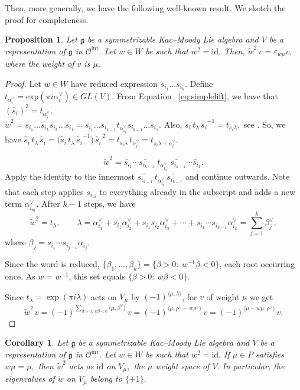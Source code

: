\documentclass[12pt,reqno]{amsart}
\theoremstyle{plain}
\newtheorem{corollary}[theorem]{Corollary}
\newtheorem{proposition}[theorem]{Proposition}
\theoremstyle{definition}
\theoremstyle{plain}
\newcommand{\catoint}{\mathcal{O}^{\mathrm{int}}}
\newcommand{\lie}{\mathfrak}
\begin{document}
Then, more generally, we have the following well-known result. We sketch the proof for completeness. 
\begin{proposition}\label{proptitslift}
    Let $\lie g$ be a symmetrizable Kac--Moody Lie algebra and $V$ be a representation of $\lie g$ in $\catoint$. Let $w\in W$ be such that $w^2=\text{id}.$ Then, $
\widetilde w^2\,v=\varepsilon_{w\mu}v,$ where the weight of $v$ is $\mu$.
\end{proposition}
\begin{proof}
    Let $w\in W$ have reduced expression $s_{i_1}\ldots s_{i_k}$. Define $t_{\alpha_i^\vee}=\text{exp}(\pi i \alpha_i^\vee) \in GL(V).$ From Equation ~\eqref{eq:simplelift}, we have that  $(\widetilde{s_i})^2=t_{\alpha_i^\vee}.$ \\
    $\widetilde{w}^2=\widetilde{s_{i_1}}\ldots\widetilde{s_{i_k}}\widetilde{s_{i_k}}\ldots\widetilde{s_{i_1}}= \widetilde{s_{i_1}}\ldots\widetilde{s_{i_{k-1}}}t_{\alpha_{i_k}^\vee}\widetilde{s_{i_{k-1}}}\ldots\widetilde{s_{i_1}}.$ Also, $\widetilde{s_i}\,t_\lambda\,\widetilde{s_i}^{-1} =t_{s_i\lambda}, $ see \cite{S1}. So, we have
$\widetilde{s_i}\,t_{\lambda}\,\widetilde{s_i}
=\bigl(\widetilde{s_i}\,t_\lambda\,\widetilde{s_i}^{-1}\bigr)\,\widetilde{s_i}^{\,2}
=t_{s_i\lambda}\,t_{\alpha_i^\vee}
=t_{s_i\lambda+\alpha_i^\vee}.$ 

\[
\widetilde w^2=\widetilde{s_{i_1}}\cdots\widetilde{s_{i_{k-1}}}\;t_{\alpha_{i_k}^\vee}\;\widetilde{s_{i_{k-1}}}\cdots\widetilde{s_{i_1}}.
\]
Apply the identity to the innermost $\widetilde{s_{i_{k-1}}}\,t_{\alpha_{i_k}^\vee}\,\widetilde{s_{i_{k-1}}}$ and continue outwards. Note that each step applies $s_{i_m}$ to everything already in the subscript and adds a new term $\alpha_{i_m}^\vee$. After $k-1$ steps, we have
\[
\widetilde w^2=t_{\lambda},\qquad
\lambda=\alpha_{i_1}^\vee+s_{i_1}\alpha_{i_2}^\vee+s_{i_1}s_{i_2}\alpha_{i_3}^\vee+\cdots+s_{i_1}\cdots s_{i_{k-1}}\alpha_{i_k}^\vee
=\sum_{j=1}^k\beta_j^\vee,
\]
where $\beta_j=s_{i_1}\cdots s_{i_{j-1}}\alpha_{i_j}.$

Since the word is reduced,
$\{\beta_1,\dots,\beta_k\}=\{\beta>0:\ w^{-1}\beta<0\}$, each root occurring once. As $w=w^{-1}$, this set equals $\{\beta>0:\ w\beta<0\}$.

Since $t_\lambda=\exp(\pi i\lambda)$ acts on $V_\mu$ by $(-1)^{\langle\mu,\lambda\rangle}$, for $v$ of weight $\mu$ we get
$$
\widetilde w^2\,v=(-1)^{\sum_{\beta>0,\ w\beta<0}\langle\mu,\beta^\vee\rangle}\,v=(-1)^{\langle \mu, \rho^\vee-w\rho^\vee\rangle}\,v=(-1)^{\langle \mu-w\mu, \rho^\vee\rangle}\,v.
$$
\end{proof}
\begin{corollary}\label{cor:eigen}
    Let $\lie g$ be a symmetrizable Kac--Moody Lie algebra and $V$ be a representation of $\lie g$ in $\catoint$. Let $w\in W$ be such that $w^2=\text{id}.$ If $\mu\in P$ satisfies $w\mu=\mu,$ then $\widetilde{w}^2$ acts as $\text{id}$ on $V_\mu,$ the $\mu$ weight space of $V.$ In particular, the eigenvalues of $\widetilde{w}$ on $V_\mu$ belong to $\{\pm1\}.$
\end{corollary}
\end{document}

